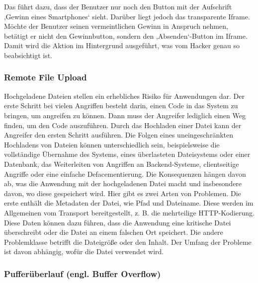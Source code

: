 Das führt dazu, dass der Benutzer nur noch den Button mit der Aufschrift ‚Gewinn eines Smartphones‘ sieht. Darüber liegt jedoch das transparente Iframe. Möchte der Benutzer seinen vermeintlichen Gewinn in Anspruch nehmen, betätigt er nicht den Gewinnbutton, sondern den ‚Absenden‘-Button im Iframe. Damit wird die Aktion im Hintergrund ausgeführt, was vom Hacker genau so beabsichtigt  ist\cite{cjd13}.\\

\subsubsection{Remote File Upload}

Hochgeladene Dateien stellen ein erhebliches Risiko für Anwendungen dar. Der erste Schritt bei vielen Angriffen besteht darin, einen Code in das System zu bringen, um angreifen zu können. Dann muss der Angreifer lediglich einen Weg finden, um den Code auszuführen. Durch das Hochladen einer Datei kann der Angreifer den ersten Schritt ausführen. Die Folgen eines uneingeschränkten Hochladens von Dateien können unterschiedlich sein, beispielsweise die vollständige Übernahme des Systems, eines überlasteten Dateisystems oder einer Datenbank, das Weiterleiten von Angriffen an Backend-Systeme, clientseitige Angriffe oder eine einfache Defacementierung. Die Konsequenzen hängen davon ab, was die Anwendung mit der hochgeladenen Datei macht und insbesondere davon, wo diese gespeichert wird. Hier gibt es zwei Arten von Problemen. Die erste enthält die Metadaten der Datei, wie Pfad und Dateiname. Diese werden im Allgemeinen vom Transport bereitgestellt, z. B. die mehrteilige HTTP-Kodierung. Diese Daten können dazu führen, dass die Anwendung eine kritische Datei überschreibt oder die Datei an einem falschen Ort speichert. Die andere Problemklasse betrifft die Dateigröße oder den Inhalt. Der Umfang der Probleme ist davon abhängig, wofür die Datei verwendet wird\cite{fileremotevul18}. \\

\subsubsection{Pufferüberlauf (engl. Buffer Overflow)}

